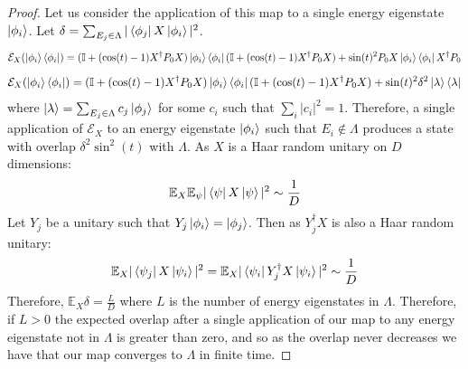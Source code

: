 \documentclass[10pt]{amsart}
\newcommand{\EE}{{\mathcal E}}
\begin{document}
\begin{proof}
    Let us consider the application of this map to a single energy eigenstate $\ket{\phi_i}$. Let $\delta = \sum_{E_j \in \Lambda} |\bra{\phi_j}X\ket{\phi_i}|^2$. 
    \begin{equation}
        \mathcal{E}_{X}(\ket{\phi_i}\bra{\phi_i}) = (\mathbb{I} + (\cos(t) -1) X^{\dagger}P_0 X)\ket{\phi_i}\bra{\phi_i} (\mathbb{I} + (\cos(t) -1) X^{\dagger}P_0 X) + \sin(t)^2P_0 X \ket{\phi_i}\bra{\phi_i} X^{\dagger} P_0
    \end{equation}
    \begin{equation}
        \mathcal{E}_{X}(\ket{\phi_i}\bra{\phi_i}) = (\mathbb{I} + (\cos(t) -1) X^{\dagger}P_0 X)\ket{\phi_i}\bra{\phi_i} (\mathbb{I} + (\cos(t) -1) X^{\dagger}P_0 X) + \sin(t)^2 \delta^2 \ket{\lambda}\bra{\lambda}
    \end{equation}
    where $\ket{\lambda} = \sum_{E_j \in \Lambda} c_j \ket{\phi_j}$ for some $c_i$ such that $\sum_i |c_i|^2 = 1$. Therefore, a single application of $\EE_X$ to an energy eigenstate $\ket{\phi_i}$ such that $E_i \notin \Lambda$ produces a state with overlap $\delta^2 \sin^2(t)$ with $\Lambda$. As $X$ is a Haar random unitary on $D$ dimensions:
    \begin{equation}
        \mathbb{E}_X\mathbb{E}_\psi |\bra{\psi}X\ket{\psi}|^2 \sim \frac{1}{D}
    \end{equation}
    Let $Y_j$ be a unitary such that $Y_j\ket{\phi_i} = \ket{\phi_j}$. Then as $Y_j^{\dagger} X$ is also a Haar random unitary:
    \begin{equation}
\mathbb{E}_X |\bra{\psi_j}X\ket{\psi_i}|^2= \mathbb{E}_X |\bra{\psi_i}Y^{\dagger}_jX\ket{\psi_i}|^2 \sim \frac{1}{D}
    \end{equation}
    Therefore, $\mathbb{E}_X \delta = \frac{L}{D}$ where $L$ is the number of energy eigenstates in $\Lambda$. Therefore, if $L>0$ the expected overlap after a single application of our map to any energy eigenstate not in $\Lambda$ is greater than zero, and so as the overlap never decreases we have that our map converges to $\Lambda$ in finite time.
    
\end{proof}
\end{document}
